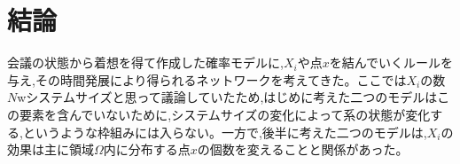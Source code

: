 \chapter{結論}

会議の状態から着想を得て作成した確率モデルに,$X_{i}$や点$x$を結んでいくルールを与え,その時間発展により得られるネットワークを考えてきた。ここでは$X_{i}$の数$N$wシステムサイズと思って議論していたため,はじめに考えた二つのモデルはこの要素を含んでいないために,システムサイズの変化によって系の状態が変化する,というような枠組みには入らない。一方で,後半に考えた二つのモデルは,$X_{i}$の効果は主に領域$\Omega$内に分布する点$x$の個数を変えることと関係があった。

